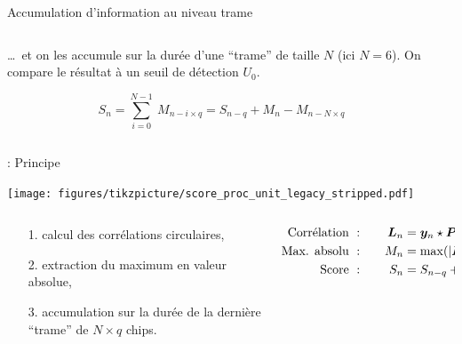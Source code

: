 \documentclass[../main.tex]{subfiles}
\begin{document}
\begin{frame}{Accumulation d'information au niveau trame}
  \begin{columns}
    \begin{column}{.5\linewidth}
      \begin{overlayarea}{\linewidth}{.875\textheight}
        \dots~et on les accumule sur la durée d'une ``trame'' de taille $N$ (ici $N = 6$). On compare le résultat à un seuil de détection $U_0$. \vspace{-1.75em}

        $$S_n = \sum_{i = 0}^{N - 1}\:M_{n - i \times q} = S_{n - q} + M_{n} - M_{n - N \times q}$$ \vspace{-2em}
        \begin{center}
          \resizebox{.6\linewidth}{!}{
            
          }
        \end{center}
      \end{overlayarea}
    \end{column}
    \begin{column}{.5\linewidth}
      \centering
      \resizebox{\linewidth}{!}{
        
      }
    \end{column}
  \end{columns}
\end{frame}

\begin{frame}{\subsecname : {Principe}}
  \begin{center}
    \texttt{[image: figures/tikzpicture/score\_proc\_unit\_legacy\_stripped.pdf]}
  \end{center}
  \begin{columns}
    \begin{column}{.5\linewidth}
      \centering
      \begin{itemize}
        \item [1.] calcul des corrélations circulaires,
        \item [2.] extraction du maximum en valeur absolue,
        \item [3.] accumulation sur la durée de la dernière ``trame'' de $N \times q$ chips.
      \end{itemize}
    \end{column}
    \begin{column}{.5\linewidth}
      \centering
      \begin{align*}
        \text{Corrélation } & :\quad & \bm{L}_n & = \bm{y}_n \star \bm{P}_{0}               \\
        \text{Max. absolu } & :\quad & M_n        & = \mathrm{max}(|\bm{L}_n|)             \\
        \text{Score }       & :\quad & S_n        & = S_{n - q} + M_{n} - M_{n - N \times q}
      \end{align*}
    \end{column}
  \end{columns}
\end{frame}
\end{document}
